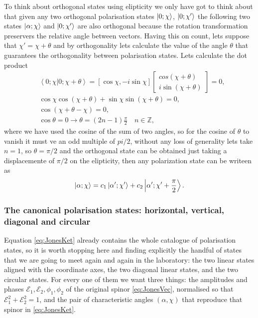             To think about orthogonal states using elipticity we only have got to think about that given any two orthogonal polarisation states $\ket{0; \chi}$, $\ket{0; \chi'}$ the following two states $\ket{\alpha;\chi}$ and $\ket{0; \chi'}$ are also orthogonal because the rotation transformation preservers the relative angle between vectors. Having this on count, lets suppose that $\chi' = \chi + \theta$ and by orthogonality lets calculate the value of the angle $\theta$ that guarantees the orthogonality between polarisation states. Lets calculate the dot product
            \begin{align*}
                & \left\langle 0;\chi | 0 ; \chi + \theta \right\rangle = \left[ \cos\chi, -i\sin\chi \right]
                \begin{bmatrix}
                    cos(\chi + \theta)\\
                    i\sin(\chi + \theta)
                \end{bmatrix} = 0,\\
                & \cos\chi \cos(\chi+\theta) + \sin\chi \sin(\chi + \theta) = 0,\\
                & \cos\left(\chi + \theta - \chi\right) = 0,\\
                & \cos\theta = 0 \longrightarrow \theta = (2n-1)\frac{\pi}{2}\quad n \in \mathbb{Z},
            \end{align*}
            where we have used the cosine of the sum of two angles, so for the cosine of $\theta$ to vanish it must ve an odd multiple of $pi/2$, without any loss of generality lets take $n = 1$, so $\theta = \pi/2$ and the orthogonal state can be obtained just taking a displacemente of $\pi/2$ on the elipticity, then any polarization state can be writeen as
            \begin{equation}\label{eq:PolSuperposition}
                \ket{\alpha;\chi} = c_1 \ket{\alpha';\chi'} + c_2 \left|\alpha'; \chi' + \frac{\pi}{2}\right\rangle. 
            \end{equation}

        \subsubsection{The canonical polarisation states: horizontal, vertical, diagonal and circular}

            Equation \ref{eq:JonesKet} already contains the whole catalogue of polarisation states, so it is worth stopping here and finding explicitly the handful of states that we are going to meet again and again in the laboratory: the two linear states aligned with the coordinate axes, the two diagonal linear states, and the two circular states. For every one of them we want three things: the amplitudes and phases $\mathcal{E}_1,\mathcal{E}_2,\phi_1,\phi_2$ of the original spinor \ref{eq:JonesVec}, normalised so that $\mathcal{E}_1^2+\mathcal{E}_2^2=1$, and the pair of characteristic angles $(\alpha,\chi)$ that reproduce that spinor in \ref{eq:JonesKet}.

